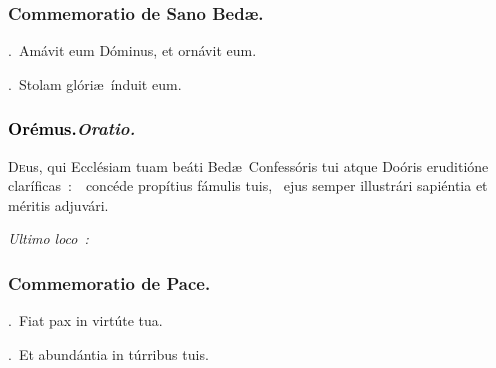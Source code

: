 \documentclass[12pt]{article} %
\newenvironment{rubric}{\color{benred8} \itshape \leftskip 0in \setlength{\parindent}{0.25in}}{\vspace{2 mm}}
\newenvironment{response}{\leftskip 0in \setlength{\parindent}{0in}}{\vspace{2 mm}}
\let\oldgresixstar\gresixstar
\renewcommand{\gresixstar}{\textcolor{benred8}{\oldgresixstar}}
\let\oldgredagger\gredagger
\renewcommand{\gredagger}{\textcolor{benred8}{\oldgredagger}}
\let\oldVbar\Vbar
\renewcommand{\Vbar}{\textcolor{benred8}{\oldVbar .}}
\let\oldRbar\Rbar
\renewcommand{\Rbar}{\textcolor{benred8}{\oldRbar .}}
\def\capitulumSpace{\hspace{20 mm}}
\begin{document}
\subsubsection*{Commemoratio de Sano Bed\ae .}

\gresetfirstlineaboveinitial{\small \textsc{ \textbf{\textcolor{benred8}{II}}}}{\small \textsc{ \textbf{\textcolor{benred8}{II}}}}


\begin{response}
\Vbar\ Am\'{a}vit eum D\'{o}minus, et orn\'{a}vit eum.

\Rbar\ Stolam gl\'{o}ri\ae\ \'{i}nduit eum.

\end{response}

\subsubsection*{\textcolor{black}{Or\'{e}mus.}\capitulumSpace \emph{Oratio.}}

\begin{response}\lettrine{D}{e}us, qui Eccl\'{e}siam tuam be\'{a}ti Bed\ae\ Confess\'{o}ris tui atque Do\'{o}ris eruditi\'{o}ne clar\'{i}ficas~:~\gredagger\ conc\'{e}de prop\'{i}tius f\'{a}mulis tuis, \gresixstar\ ejus semper illustr\'{a}ri sapi\'{e}ntia et m\'{e}ritis adjuv\'{a}ri.

\end{response}

\begin{rubric}
Ultimo loco~:

\end{rubric}



\subsubsection*{Commemoratio de Pace.}


\gresetfirstlineaboveinitial{\small \textsc{ \textbf{\textcolor{benred8}{II}}}}{\small \textsc{ \textbf{\textcolor{benred8}{II}}}}

\begin{response}
\Vbar\ Fiat pax in virt\'{u}te tua.

\Rbar\ Et abund\'{a}ntia in t\'{u}rribus tuis.

\end{response}
\end{document}
